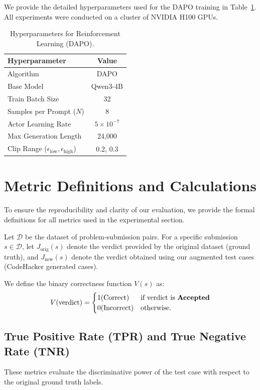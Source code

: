 \documentclass[11pt]{article}
\begin{document}
We provide the detailed hyperparameters used for the DAPO training in Table~\ref{tab:rl_params}. All experiments were conducted on a cluster of NVIDIA H100 GPUs.
\begin{table}[h]
\centering
\small
\renewcommand{\arraystretch}{1.2}
\begin{tabular}{l c}
\toprule
\textbf{Hyperparameter} & \textbf{Value} \\
\midrule
Algorithm & DAPO \\
Base Model & Qwen3-4B \\
Train Batch Size & 32 \\
Samples per Prompt ($N$) & 8 \\
Actor Learning Rate & $5 \times 10^{-7}$ \\
Max Generation Length & 24,000 \\
Clip Range ($\epsilon_{\text{low}}, \epsilon_{\text{high}}$) & 0.2, 0.3 \\
\bottomrule
\end{tabular}
\caption{Hyperparameters for Reinforcement Learning (DAPO).}
\label{tab:rl_params}
\end{table}

\section{Metric Definitions and Calculations}
\label{appx:metrics}

To ensure the reproducibility and clarity of our evaluation, we provide the formal definitions for all metrics used in the experimental section.

Let $\mathcal{D}$ be the dataset of problem-submission pairs. For a specific submission $s \in \mathcal{D}$, let $J_{\text{orig}}(s)$ denote the verdict provided by the original dataset (ground truth), and $J_{\text{new}}(s)$ denote the verdict obtained using our augmented test cases (CodeHacker generated cases).

We define the binary correctness function $V(s)$ as:
\[
V(\text{verdict}) = \begin{cases} 
1 (\text{Correct}) & \text{if verdict is \textbf{Accepted}} \\
0 (\text{Incorrect}) & \text{otherwise.}
\end{cases}
\]

\subsection{True Positive Rate (TPR) and True Negative Rate (TNR)}
These metrics evaluate the discriminative power of the test case with respect to the original ground truth labels.
\end{document}
